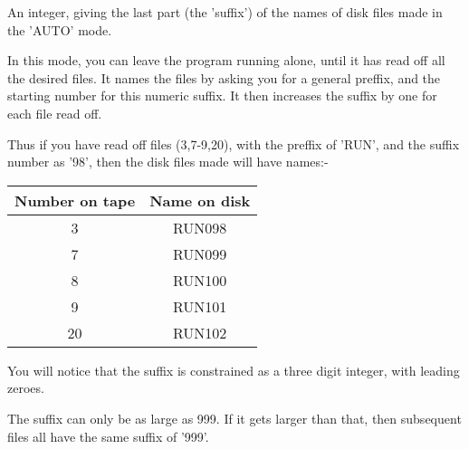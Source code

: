 {{{  An integer, giving the last part (the 'suffix') of the names of disk
  files made in the 'AUTO' mode.
                                                                               
  In this mode, you can leave the program running alone, until it has
  read off all the desired files. It names the files by asking you
  for a general preffix, and the starting number for this numeric
  suffix. It then increases the suffix by one for each file read off.
                                                                               
  Thus if you have read off files (3,7-9,20), with the preffix
  of 'RUN', and the suffix number as '98', then the disk files made
  will have names:-
                                                                               
\begin{tabular}{|c|c|}\hline
       Number on tape    &   Name on disk \\ \hline
             3            &    RUN098 \\
             7            &    RUN099 \\
             8            &    RUN100 \\
             9            &    RUN101 \\
            20            &    RUN102 \\ \hline
\end{tabular}
                                                                               
  You will notice that the suffix is constrained as a three digit
  integer, with leading zeroes.
                                                                               
  The suffix can only be as large as 999. If it gets larger than
  that, then subsequent files all have the same suffix of '999'.
                                                                               
}}}

 

